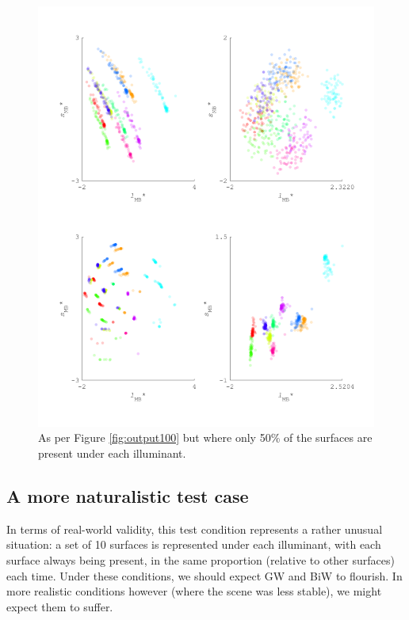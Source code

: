 \begin{figure}[htbp] %
\includegraphics[max width=1.2\textwidth,center]{figs/comp/comparisonFourAlgos/output50.pdf}
 \caption{As per Figure \ref{fig:output100} but where only 50\% of the surfaces are present under each illuminant.}
 \label{fig:output50}
\end{figure} 


\subsection{A more naturalistic test case}

In terms of real-world validity, this test condition represents a rather unusual situation: a set of 10 surfaces is represented under each illuminant, with each surface always being present, in the same proportion (relative to other surfaces) each time. Under these conditions, we should expect \gls{GW} and \gls{BiW} to flourish. In more realistic conditions however (where the scene was less stable), we might expect them to suffer.

